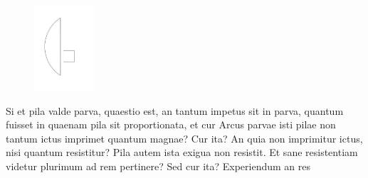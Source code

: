 \pstart
     \begin{figure}                    
    \includegraphics[trim = 36mm 48mm 60mm 42.5mm, clip,width=0.2\textwidth]{images/lh03705_004v-d1.pdf}
 \noindent {} 
     \end{figure}
Si   et pila\protect{} valde parva, quaestio est, an tantum impetus\protect{} sit in parva, quantum fuisset in  quaenam pila\protect{} sit proportionata, et cur Arcus\protect{} parvae isti pilae\protect{} non tantum ictus\protect{} imprimet quantum magnae? Cur ita? An quia non imprimitur ictus, nisi quantum resistitur? Pila\protect{} autem ista exigua non resistit. Et sane resistentiam videtur plurimum ad rem pertinere? Sed cur ita? Experiendum an res%